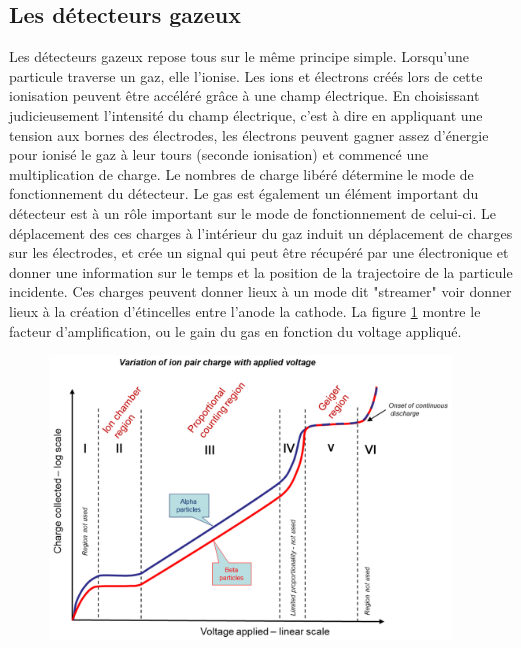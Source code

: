 \subsection{Les détecteurs gazeux}
Les détecteurs gazeux repose tous sur le même principe simple. Lorsqu'une particule traverse un gaz, elle l'ionise. Les ions et électrons créés lors de cette ionisation peuvent être accéléré grâce à une champ électrique. En choisissant judicieusement l'intensité du champ électrique, c'est à dire en appliquant une tension aux bornes des électrodes, les électrons peuvent gagner assez d'énergie pour ionisé le gaz à leur tours (seconde ionisation) et commencé une multiplication de charge. Le nombres de charge libéré détermine le mode de fonctionnement du détecteur. Le gas est également un élément important du détecteur est à un rôle important sur le mode de fonctionnement de celui-ci. Le déplacement des ces charges à l'intérieur du gaz induit un déplacement de charges sur les électrodes, et crée un signal qui peut être récupéré par une électronique et donner une information sur le temps et la position de la trajectoire de la particule incidente. Ces charges peuvent donner lieux à un mode dit "streamer" voir donner lieux à la création d'étincelles entre l'anode la cathode. La figure \ref{mult} montre le facteur d'amplification, ou le gain du gas en fonction du voltage appliqué. 

\begin{figure}[h!]
	\centering
	\includegraphics[width=0.95\textwidth]{RPC/gasgain.png}
	\label{mult}
\end{figure}

